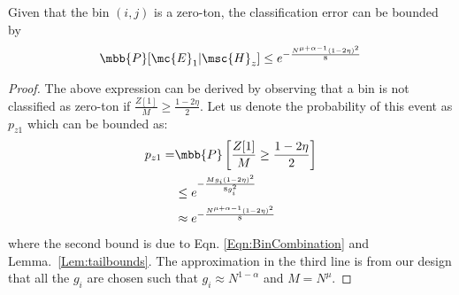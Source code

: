 \begin{lemma}
\label{Lem:ZerotonClassif}
Given that the bin $(i,j)$ is a zero-ton, the classification error can be bounded by
\begin{align*}
\mbb{P}[\mc{E}_1|\msc{H}_z]\leq e^{-\frac{N^{\mu+\alpha-1}(1-2\eta)^2}{8}}
\end{align*}
\end{lemma}
\begin{proof}
The above expression can be derived by observing that a bin is not classified as zero-ton if $\frac{Z[1]}{M}\geq\frac{1-2\eta}{2}$. Let us denote the probability of this event as $p_{z1}$ which can be bounded as:
\begin{align*}
p_{z1}=&\mbb{P}\left[\frac{Z[1]}{M}\geq\frac{1-2\eta}{2}\right]\\
&\leq e^{-\frac{Mg_i(1-2\eta)^2}{8g_i^{2}}}\\
&\approx e^{-\frac{N^{\mu+\alpha-1}(1-2\eta)^2}{8}}
\end{align*} 
where the second bound is due to Eqn. \eqref{Eqn:BinCombination} and Lemma.~\ref{Lem:tailbounds}. The approximation in the third line is from our design that all the $g_i$ are chosen such that $g_i\approx N^{1-\alpha}$ and $M=N^{\mu}.$
\end{proof}


